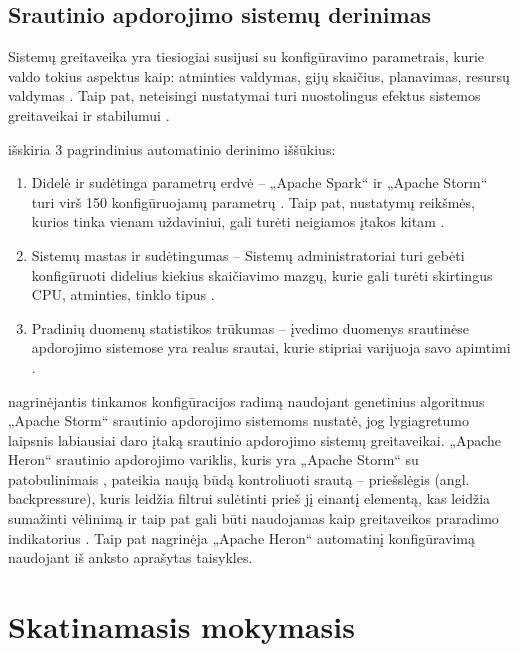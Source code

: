 \documentclass{VUMIFPSbakalaurinis}
\begin{document}
\subsection{Srautinio apdorojimo sistemų derinimas}
Sistemų greitaveika yra tiesiogiai susijusi su konfigūravimo parametrais, kurie valdo tokius aspektus kaip: atminties valdymas, gijų skaičius, planavimas, resursų valdymas \cite{lu2019speedup}. Taip pat, neteisingi nustatymai turi nuostolingus efektus sistemos greitaveikai ir stabilumui \cite{herodotou2011starfish}. 

\cite{herodotou2020survey} išskiria 3 pagrindinius automatinio derinimo iššūkius:
\begin{enumerate}
    \item Didelė ir sudėtinga parametrų erdvė – „Apache Spark“ ir „Apache Storm“ turi virš 150 konfigūruojamų parametrų \cite{Bilal2017Towards, petridis2016spark}. Taip pat, nustatymų reikšmės, kurios tinka vienam uždaviniui, gali turėti neigiamos įtakos kitam \cite{herodotou2011starfish, Pooyan2016Uncertainty}.
    \item Sistemų mastas ir sudėtingumas – Sistemų administratoriai turi gebėti konfigūruoti didelius kiekius skaičiavimo mazgų, kurie gali turėti skirtingus CPU, atminties, tinklo tipus \cite{herodotou2020survey}.
    \item Pradinių duomenų statistikos trūkumas – įvedimo duomenys srautinėse apdorojimo sistemose yra realus srautai, kurie stipriai varijuoja savo apimtimi \cite{Dayarathna2018Recent}.
\end{enumerate}  

\cite{Trotter2017Into} nagrinėjantis tinkamos konfigūracijos radimą naudojant genetinius algoritmus „Apache Storm“ srautinio apdorojimo sistemoms nustatė, jog lygiagretumo laipsnis labiausiai daro įtaką srautinio apdorojimo sistemų greitaveikai. „Apache Heron“ srautinio apdorojimo variklis, kuris yra „Apache Storm“ su patobulinimais \cite{twitterHeron}, pateikia naują būdą kontroliuoti srautą – priešslėgis (angl. backpressure), kuris leidžia filtrui sulėtinti prieš jį einantį elementą, kas leidžia sumažinti vėlinimą ir taip pat gali būti naudojamas kaip greitaveikos praradimo indikatorius \cite{bansal2018trevor}.
Taip pat \cite{bansal2018trevor} nagrinėja „Apache Heron“ automatinį konfigūravimą naudojant iš anksto aprašytas taisykles. 

\section{Skatinamasis mokymasis}
\end{document}
